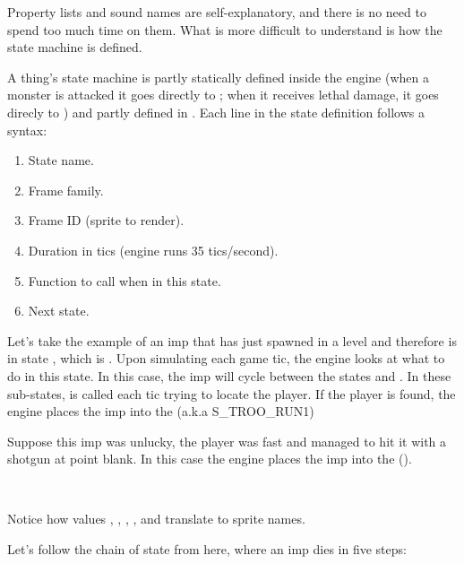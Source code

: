 Property lists and sound names are self-explanatory, and there is no need to spend too much time on them. What is more difficult to understand is how the state machine is defined.\\
\par
A thing's state machine is partly statically defined inside the engine (when a monster is attacked it goes directly to ; when it receives lethal damage, it goes direcly to ) and partly defined in . Each line in the state definition follows a syntax:
\begin{enumerate}
\item State name.
\item Frame family.
\item Frame ID (sprite to render).
\item Duration in tics (engine runs 35 tics/second).
\item Function to call when in this state.
\item Next state.
\end{enumerate}
\par
Let's take the example of an imp that has just spawned in a level and therefore is in state , which is . Upon simulating each game tic, the engine looks at what to do in this state. In this case, the imp will cycle between the states  and . In these sub-states,  is called each tic trying to locate the player. If the player is found, the engine places the imp into the  (a.k.a S\_TROO\_RUN1)\\
\par

Suppose this imp was unlucky, the player was fast and managed to hit it with a shotgun at point blank. In this case the engine places the imp into the  ().\\
\par
{}\\
\par
Notice how values , , , , and  translate to sprite names.\\
\par
{}
Let's follow the chain of state from here, where an imp dies in five steps:

